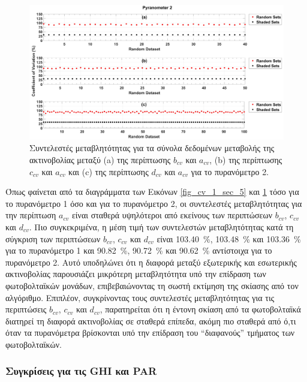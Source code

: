 \documentclass[12pt, a4paper]{report} %
\newcommand{\english}{\foreignlanguage{english}}
\begin{document}
\begin{figure}[H]
    \centering
    \includegraphics[width=0.9\linewidth]{CV_2_sec_5.jpg}
    \caption{Συντελεστές μεταβλητότητας για τα σύνολα δεδομένων μεταβολής της ακτινοβολίας μεταξύ 
    (\english{a}) της περίπτωσης \english{$b_{cv}$} και \english{$a_{cv}$}, (\english{b}) της περίπτωσης \english{$c_{cv}$} και 
    \english{$a_{cv}$} και (\english{c}) της περίπτωσης \english{$d_{cv}$} και \english{$a_{cv}$} για το πυρανόμετρο 2.}
    \label{fig_cv_2_sec_5}
\end{figure}

Όπως φαίνεται από τα διαγράμματα των Εικόνων \ref{fig_cv_1_sec_5} και \ref{fig_cv_2_sec_5} τόσο για το πυρανόμετρο 1 όσο και 
για το πυρανόμετρο 2, οι συντελεστές μεταβλητότητας για την περίπτωση \english{$a_{cv}$} είναι σταθερά υψηλότεροι από εκείνους 
των περιπτώσεων \english{$b_{cv}$}, \english{$c_{cv}$} και \english{$d_{cv}$}. Πιο συγκεκριμένα, η μέση τιμή των συντελεστών 
μεταβλητότητας κατά τη σύγκριση των περιπτώσεων \english{$b_{cv}$}, \english{$c_{cv}$} και \english{$d_{cv}$} είναι 
\SI{103,40}{\percent}, \SI{103,48}{\percent} και \SI{103,36}{\percent} για το πυρανόμετρο 1 και \SI{90,82}{\percent}, 
\SI{90,72}{\percent} και \SI{90,62}{\percent} αντίστοιχα για το πυρανόμετρο 2. Αυτό υποδηλώνει ότι η διαφορά μεταξύ εξωτερικής 
και εσωτερικής ακτινοβολίας παρουσιάζει μικρότερη μεταβλητότητα υπό την επίδραση των φωτοβολταϊκών μονάδων, επιβεβαιώνοντας 
τη σωστή εκτίμηση της σκίασης από τον αλγόριθμο. Επιπλέον, συγκρίνοντας τους συντελεστές μεταβλητότητας για τις περιπτώσεις 
\english{$b_{cv}$}, \english{$c_{cv}$} και \english{$d_{cv}$}, παρατηρείται ότι η έντονη σκίαση από τα φωτοβολταϊκά διατηρεί 
τη διαφορά ακτινοβολίας σε σταθερά επίπεδα, ακόμη πιο σταθερά από ό,τι όταν τα πυρανόμετρα βρίσκονται υπό την επίδραση του 
“διαφανούς” τμήματος των φωτοβολταϊκών.

\subsubsection{Συγκρίσεις για τις \english{GHI} και \english{PAR}}\label{sub_alg_advanc_GHI_PAR}
\end{document}
